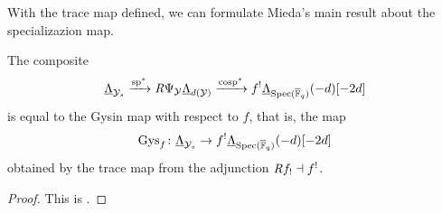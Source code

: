 \documentclass[../main.tex]{subfiles}
\begin{document}
With the trace map defined, we can formulate Mieda's main result about the
specializazion map.
\begin{prop}\label{prop:MiedaFirstStepSpecMap}
  The composite 
  \begin{equation*}
    \underline{\Lambda}_{\mathcal{Y}_s} \xrightarrow{\mathrm{sp}^*} \mathit R \Psi_{\mathcal{Y}} \underline
    \Lambda_{d(\mathcal{Y})} \xrightarrow{\mathrm{cosp}^*} f^! \underline
    \Lambda_{\operatorname{Spec}({\overline {\mathbb{F}}_q})}(-d)[-2d]
  \end{equation*}
  is equal to the Gysin map with respect to $f$, that is, the map
  \begin{equation*}
    \mathrm{Gys}_f \colon \underline \Lambda_{\mathcal{Y}_s} \to f^! \underline
    \Lambda_{\operatorname{Spec}({\overline {\mathbb{F}}_q})}(-d)[-2d]
  \end{equation*}
  obtained by the trace map from the adjunction $\mathit R f_! \dashv f^!$.
  \begin{proof}
    This is \cite[Theorem 2.1]{mieda2016geometric}.
  \end{proof}
\end{prop}
\end{document}
